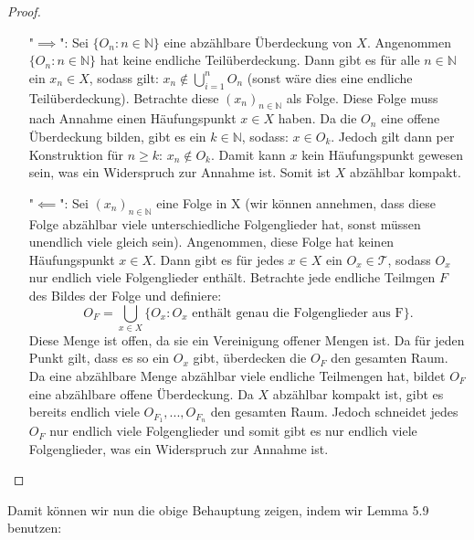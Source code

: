 \documentclass[11pt]{scrartcl}
\begin{document}
\begin{proof}\hfill
	\begin{itemize}
		\item["$\implies$":]Sei $\{O_n: n\in\mathbb N\}$ eine abzählbare Überdeckung von $X$. Angenommen $\{O_n: n\in\mathbb N\}$ hat keine endliche Teilüberdeckung. Dann gibt es für alle $n\in\mathbb N$ ein $x_n \in X$, sodass gilt: $x_n\notin \bigcup_{i=1}^n O_n$ (sonst wäre dies eine endliche Teilüberdeckung). Betrachte diese $(x_n)_{n\in\mathbb N}$ als Folge. Diese Folge muss nach Annahme einen Häufungspunkt $x\in X$ haben. Da die $O_n$ eine offene Überdeckung bilden, gibt es ein $k\in\mathbb N$, sodass: $x\in O_k$. Jedoch gilt dann per Konstruktion für $n\geq k$: $x_n\notin O_k$. Damit kann $x$ kein Häufungspunkt gewesen sein, was ein Widerspruch zur Annahme ist. Somit ist $X$ abzählbar kompakt.
		\item["$\impliedby$":] Sei $(x_n)_{n\in\mathbb N}$ eine Folge in X (wir können annehmen, dass diese Folge abzählbar viele unterschiedliche Folgenglieder hat, sonst müssen unendlich viele gleich sein). 
			Angenommen, diese Folge hat keinen Häufungspunkt $x\in X$. Dann gibt es für jedes $x\in X$ ein $O_x \in \mathcal T$, sodass $O_x$ nur endlich viele Folgenglieder enthält. 
			Betrachte jede endliche Teilmgen $F$ des Bildes der Folge und definiere: $$O_F = \bigcup_{x\in X} \{ O_x: O_x \textrm{ enthält genau die Folgenglieder aus F}\}.$$
			Diese Menge ist offen, da sie ein Vereinigung offener Mengen ist. Da für jeden Punkt gilt, dass es so ein $O_x$ gibt, überdecken die $O_F$ den gesamten Raum. 
			Da eine abzählbare Menge abzählbar viele endliche Teilmengen hat, bildet $O_F$ eine abzählbare offene Überdeckung. 
			Da $X$ abzählbar kompakt ist, gibt es bereits endlich viele $O_{F_1},..., O_{F_n}$ den gesamten Raum. 
			Jedoch schneidet jedes $O_F$ nur endlich viele Folgenglieder und somit gibt es nur endlich viele Folgenglieder, was ein Widerspruch zur Annahme ist.
	\end{itemize}
\end{proof}
\noindent Damit können wir nun die obige Behauptung zeigen, indem wir Lemma 5.9 benutzen:
\end{document}

